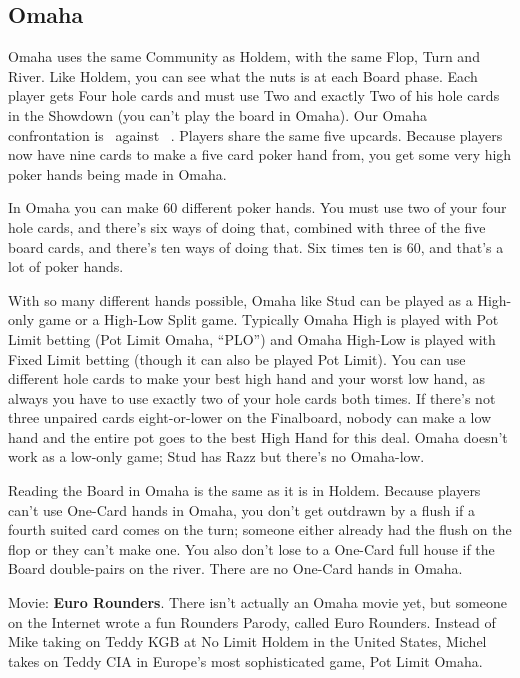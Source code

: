 \subsection{Omaha}

Omaha uses the same Community as
Holdem, with the same Flop, Turn and River. Like Holdem, you can see
what the nuts is at each Board phase. Each player gets Four hole
cards and must use Two and exactly Two of his hole cards in the
Showdown (you can't play the board in Omaha). Our Omaha confrontation
is 
\back\back\back\back\nines\Qd\Jd\tres\fourd\ against
\back\back\back\back\nines\Qd\Jd\tres\fourd\ . Players share the same five
upcards. Because players now have nine cards to make a five card poker
hand from, you get some very high poker hands being made in Omaha.

In Omaha you can make 60 different poker hands. You must use two of
your four hole cards, and there's six ways of doing that, combined
with three of the five board cards, and there's ten ways of doing
that. Six times ten is 60, and that's a lot of poker hands.

With so many different hands possible, Omaha like Stud can be played
as a High-only game or a High-Low Split game. Typically Omaha High is
played with Pot Limit betting (Pot Limit Omaha, ``PLO'') and Omaha
High-Low is played with Fixed Limit betting (though it can also be played
Pot Limit). You can use different hole cards to make your best high
hand and your worst low hand, as always you have to use exactly two of
your hole cards both times. If there's not three unpaired cards
eight-or-lower on the Finalboard, nobody can make a low hand and the
entire pot goes to the best High Hand for this deal. Omaha doesn't
work as a low-only game; Stud has Razz but there's no Omaha-low.

Reading the Board in Omaha is the same as it is in Holdem. Because
players can't use One-Card hands in Omaha, you don't get outdrawn
by a flush if a fourth suited card comes on the turn; someone either
already had the flush on the flop or they can't make one. You also
don't lose to a One-Card full house if the Board double-pairs on
the river. There are no One-Card hands in Omaha.

Movie: \textbf{Euro Rounders}. There isn't actually an Omaha movie
yet, but someone on the Internet wrote a fun Rounders Parody, called
Euro Rounders. Instead of Mike taking on Teddy KGB at No Limit Holdem
in the United States, Michel takes on Teddy CIA in Europe's most
sophisticated game, Pot Limit Omaha.

